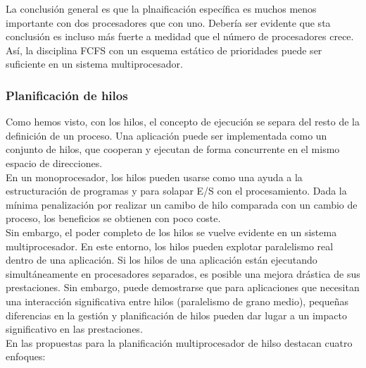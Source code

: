 \documentclass{article}
\begin{document}
					La conclusión general es que la plnaificación específica es muchos menos importante con dos procesadores que con uno. Debería ser evidente que sta conclusión es incluso más fuerte a medidad que el número de procesadores crece. Así, la disciplina FCFS con un esquema estático de prioridades puede ser suficiente en un sistema multiprocesador. 
					
				\subsubsection{Planificación de hilos}
					Como hemos visto, con los hilos, el concepto de ejecución se separa del resto de la definición de un proceso. Una aplicación puede ser implementada como un conjunto de hilos, que cooperan y ejecutan de forma concurrente en el mismo espacio de direcciones. \\
					
					En un monoprocesador, los hilos pueden usarse como una ayuda a la estructuración de programas y para solapar E/S con el procesamiento. Dada la mínima penalización por realizar un camibo de hilo comparada con un cambio de proceso, los beneficios se obtienen con poco coste. \\
					
					Sin embargo, el poder completo de los hilos se vuelve evidente en un sistema multiprocesador. En este entorno, los hilos pueden explotar paralelismo real dentro de una aplicación. Si los hilos de una aplicación están ejecutando simultáneamente en procesadores separados, es posible una mejora drástica de sus prestaciones. Sin embargo, puede demostrarse que para aplicaciones que necesitan una interacción significativa entre hilos (paralelismo de grano medio), pequeñas diferencias en la gestión y planificación de hilos pueden dar lugar a un impacto significativo en las prestaciones. \\
					
					En las propuestas para la planificación multiprocesador de hilso destacan cuatro enfoques:
					
\end{document}
